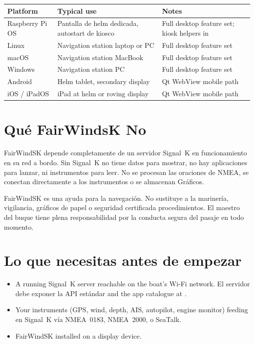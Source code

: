 \begin{longtable}{L{3.0cm}L{4.8cm}L{5.9cm}}
\toprule
{}
\color{white}\sffamily\bfseries Platform &
\color{white}\sffamily\bfseries Typical use &
\color{white}\sffamily\bfseries Notes \\
\midrule
Raspberry Pi OS&Pantalla de helm dedicada, autostart de kiosco&
  Full desktop feature set; kiosk helpers in  \\
Linux           & Navigation station laptop or PC    & Full desktop feature set \\
macOS           & Navigation station MacBook         & Full desktop feature set \\
Windows         & Navigation station PC              & Full desktop feature set \\
Android         & Helm tablet, secondary display     & Qt WebView mobile path \\
iOS / iPadOS    & iPad at helm or roving display     & Qt WebView mobile path \\
\bottomrule
\end{longtable}

\section{Qué FairWindsK No}

FairWindSK depende completamente de un servidor Signal~K en funcionamiento en su red a bordo.
Sin Signal~K no tiene datos para mostrar, no hay aplicaciones para lanzar, ni instrumentos
para leer.
No se procesan las oraciones de NMEA, se conectan directamente a los instrumentos o se almacenan
Gráficos.

\begin{warningbox}
FairWindSK es una ayuda para la navegación.
No sustituye a la marinería, vigilancia, gráficos de papel o seguridad certificada
procedimientos.
El maestro del buque tiene plena responsabilidad por la conducta segura del pasaje
en todo momento.
\end{warningbox}

\section{Lo que necesitas antes de empezar}

\begin{itemize}
  \item A running Signal~K server reachable on the boat's Wi-Fi network.
El servidor debe exponer la API estándar
         and the app catalogue at
        .
  \item Your instruments (GPS, wind, depth, AIS, autopilot, engine monitor) feeding
en Signal~K vía NMEA~0183, NMEA~2000, o SeaTalk.
  \item FairWindSK installed on a display device.
\end{itemize}

